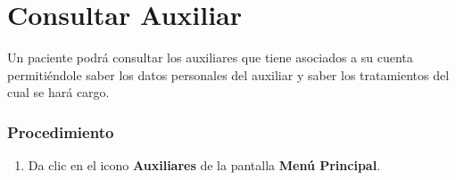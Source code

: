 \section{Consultar Auxiliar}

Un paciente podrá consultar los auxiliares que tiene asociados a
su cuenta permitiéndole saber los datos personales del auxiliar y saber los tratamientos del cual se hará cargo.

\subsubsection{Procedimiento}
\begin{enumerate}
	
	\item Da clic en el icono \textbf{Auxiliares} de la pantalla \textbf{Menú Principal}.


\end{enumerate}
